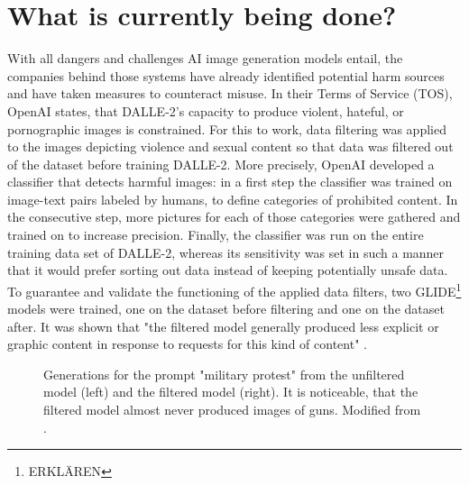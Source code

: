 \documentclass[10pt,twocolumn,twoside]{osajnl}
\begin{document}
\section{What is currently being done?}
\label{section:6}
With all dangers and challenges AI image generation models entail, the companies behind those systems have already identified potential harm sources and have taken measures to counteract misuse.
In their Terms of Service (TOS), OpenAI states, that DALLE-2's capacity to produce violent, hateful, or pornographic images is constrained. 
For this to work, data filtering was applied to the images depicting violence and sexual content so that data was filtered out of the dataset before training DALLE-2.
More precisely, OpenAI developed a classifier that detects harmful images: in a first step the classifier was trained on image-text pairs labeled by humans, to define categories 
of prohibited content. In the consecutive step, more pictures for each of those categories were gathered and trained on to increase precision. Finally, the classifier was run on the entire 
training data set of DALLE-2, whereas its sensitivity was set in such a manner that it would prefer sorting out data instead of keeping potentially unsafe data. 
To guarantee and validate the functioning of the applied data filters, two GLIDE\footnote[5]{ERKLÄREN} models were trained, one on the dataset before filtering and one on the dataset after.
It was shown that "the filtered model generally produced less explicit or graphic content in response to requests for this kind of content" \cite{openaifilters}. 
\begin{figure}[htbp]
	\centering
	\caption{Generations for the prompt "military protest" from the unfiltered model (left) and the filtered model (right). 
	It is noticeable, that the filtered model almost never produced images of guns. Modified from \cite{openaifilters}.}
	\label{filters}
\end{figure}
\end{document}
